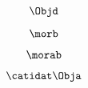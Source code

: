 \begin{forslides}
        
        \begin{equation}
            \label{eq:semicats-slides-111}
            \Objd
        \end{equation}
        
        
         \begin{equation}
            \label{eq:semicats-slides-112}
            \morb
        \end{equation}
        
        
         \begin{equation}
            \label{eq:semicats-slides-113}
            \morab
        \end{equation}
        
        
         \begin{equation}
            \label{eq:semicats-slides-114}
            \catidat\Obja
        \end{equation}
        

\end{forslides}
